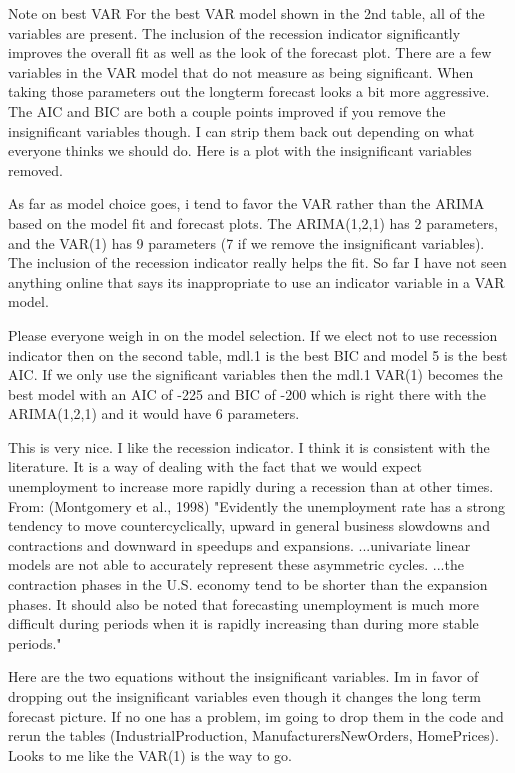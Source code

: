 \documentclass[twoside,twocolumn]{article}
\begin{document}
 
 Note on best VAR
For the best VAR model shown in the 2nd table, all of the variables are present. The inclusion of the recession indicator significantly improves the overall fit as well as the look of the forecast plot. There are a few variables in the VAR model that do not measure as being significant. When taking those parameters out the longterm forecast looks a bit more aggressive. The AIC and BIC are both a couple points improved if you remove the insignificant variables though. I can strip them back out depending on what everyone thinks we should do. Here is a plot with the insignificant variables removed.

As far as model choice goes, i tend to favor the VAR rather than the ARIMA based on the model fit and forecast plots. The ARIMA(1,2,1) has 2 parameters, and the VAR(1) has 9 parameters (7 if we remove the insignificant variables). The inclusion of the recession indicator really helps the fit. So far I have not seen anything online that says its inappropriate to use an indicator variable in a VAR model.

Please everyone weigh in on the model selection. If we elect not to use recession indicator then on the second table, mdl.1 is the best BIC and model 5 is the best AIC. If we only use the significant variables then the mdl.1 VAR(1) becomes the best model with an AIC of -225 and BIC of -200 which is right there with the ARIMA(1,2,1) and it would have 6 parameters.

This is very nice. I like the recession indicator. I think it is consistent with the literature. It is a way of dealing with the fact that we would expect unemployment to increase more rapidly during a recession than at other times. From: (Montgomery et al., 1998) "Evidently the unemployment rate has a strong tendency to move countercyclically, upward in general business slowdowns and contractions and downward in speedups and expansions. ...univariate linear models are not able to accurately represent these asymmetric cycles. ...the contraction phases in the U.S. economy tend to be shorter than the expansion phases. It should also be noted that forecasting unemployment is much more difficult during periods when it is rapidly increasing than during more stable periods."



Here are the two equations without the insignificant variables. Im in favor of dropping out the insignificant variables even though it changes the long term forecast picture. If no one has a problem, im going to drop them in the code and rerun the tables (IndustrialProduction, ManufacturersNewOrders, HomePrices). Looks to me like the VAR(1) is the way to go.
\end{document}
